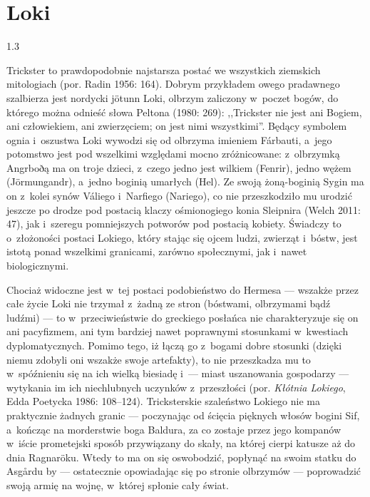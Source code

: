 \documentclass[11pt,a4paper,twoside]{report}
\begin{document}
\section{Loki}
\begin{spacing}{1.3}

Trickster to prawdopodobnie najstarsza postać we wszystkich ziemskich mitologiach (por. Radin 1956: 164). Dobrym przykładem owego pradawnego szalbierza jest nordycki jötunn Loki, olbrzym zaliczony w~poczet bogów, do którego można odnieść słowa Peltona (1980: 269): ,,Trickster nie jest ani Bogiem, ani człowiekiem, ani zwierzęciem; on jest nimi wszystkimi''. Będący symbolem ognia i~oszustwa Loki wywodzi się od olbrzyma imieniem Fárbauti, a~jego potomstwo jest pod wszelkimi względami mocno zróżnicowane: z~olbrzymką Angrboðą ma on troje dzieci, z~czego jedno jest wilkiem (Fenrir), jedno wężem (Jörmungandr), a~jedno boginią umarłych (Hel). Ze swoją żoną-boginią Sygin ma on z~kolei synów Váliego i~Narfiego (Nariego), co nie przeszkodziło mu urodzić jeszcze po drodze pod postacią klaczy ośmionogiego konia Sleipnira (Welch 2011: 47), jak i~szeregu pomniejszych potworów pod postacią kobiety. Świadczy to o~złożoności postaci Lokiego, który stając się ojcem ludzi, zwierząt i~bóstw, jest istotą ponad wszelkimi granicami, zarówno społecznymi, jak i~nawet biologicznymi.

Chociaż widoczne jest w~tej postaci podobieństwo do Hermesa --- wszakże przez całe życie Loki nie trzymał z~żadną ze stron (bóstwami, olbrzymami bądź ludźmi) --- to w~przeciwieństwie do greckiego posłańca nie charakteryzuje się on ani pacyfizmem, ani tym bardziej nawet poprawnymi stosunkami w~kwestiach dyplomatycznych. Pomimo tego, iż łączą go z~bogami dobre stosunki (dzięki niemu zdobyli oni wszakże swoje artefakty), to nie przeszkadza mu to w~spóźnieniu się na ich wielką biesiadę i~--- miast uszanowania gospodarzy --- wytykania im ich niechlubnych uczynków z~przeszłości (por. \emph{Kłótnia Lokiego}, Edda Poetycka 1986: 108--124). Tricksterskie szaleństwo Lokiego nie ma praktycznie żadnych granic --- poczynając od ścięcia pięknych włosów bogini Sif, a~kończąc na morderstwie boga Baldura, za co zostaje przez jego kompanów w~iście prometejski sposób przywiązany do skały, na której cierpi katusze aż do dnia Ragnaröku. Wtedy to ma on się oswobodzić, popłynąć na swoim statku do Asgårdu by --- ostatecznie opowiadając się po stronie olbrzymów --- poprowadzić swoją armię na wojnę, w~której spłonie cały świat.
\end{spacing}
\end{document}
